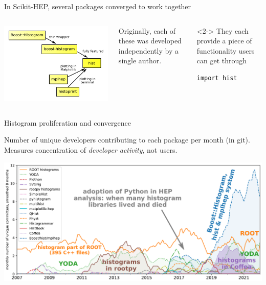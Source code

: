\documentclass[aspectratio=169]{beamer}
\begin{document}
\begin{frame}[fragile]{In Scikit-HEP, several packages converged to work together}
\vspace{0.5 cm}
\begin{columns}
\includegraphics[width=\linewidth]{PLOTS/histogram-convergence.pdf}

Originally, each of these was developed independently by a single author.

\vspace{0.75 cm}
\begin{uncoverenv}<2->
They each provide a piece of functionality users can get through

\begin{verbatim}
import hist
\end{verbatim}
\end{uncoverenv}

\vspace{0.75 cm}
\end{columns}
\end{frame}

\begin{frame}{Histogram proliferation and convergence}
\large
\vspace{0.25 cm}

Number of unique developers contributing to each package per month (in git). Measures concentration of {\it developer activity}, not users.

\vspace{0.1 cm}
\includegraphics[width=\linewidth]{PLOTS/github-histogram-libraries.pdf}
\end{frame}
\end{document}
